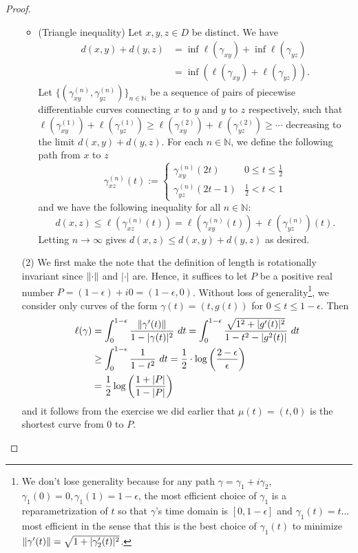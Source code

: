 \documentclass[10pt]{article}
\theoremstyle{plain}
\begin{document}
\begin{proof}
\begin{itemize}
\begin{itemize}
						\item (Triangle inequality) Let $x, y, z \in D$ be distinct. We have
							\begin{align*}
								d(x, y) + d(y, z) &= \inf \ell (\gamma_{xy}) + \inf{\ell(\gamma_{yz})} \\
								&= \inf( \ell(\gamma_{xy}) + \ell(\gamma_{yz})).
							\end{align*}
						Let $\{(\gamma_{xy}^{(n)}, \gamma_{yz}^{(n)})\}_{n \in \mathbb{N}}$ be a sequence of pairs of piecewise differentiable curves connecting $x$ to $y$ and $y$ to $z$ respectively, such that $\ell(\gamma_{xy}^{(1)}) + \ell(\gamma_{yz}^{(1)}) \geq \ell(\gamma_{xy}^{(2)}) + \ell(\gamma_{yz}^{(2)}) \geq \cdots$ decreasing to the limit $d(x, y) + d(y, z)$. For each $n \in \mathbb{N}$, we define the following path from $x$ to $z$ $$\gamma_{xz}^{(n)}(t) := \begin{cases}\gamma_{xy}^{(n)}(2t) & 0 \leq t \leq \frac{1}{2} \\ \gamma_{yz}^{(n)}(2t - 1) & \frac{1}{2} < t < 1\end{cases}$$ and we have the following inequality for all $n \in \mathbb{N}$: $$d(x, z) \leq \ell(\gamma_{xz}^{(n)}(t)) = \ell(\gamma_{xy}^{(n)}(t)) + \ell(\gamma_{yz}^{(n)})(t).$$ Letting $n \to \infty$ gives $d(x, z) \leq d(x, y) + d(y, z)$ as desired. 
					\end{itemize}
				
				\item[(2)] We first make the note that the definition of length is rotationally invariant since $\norm{\cdot}$ and $|\cdot|$ are. Hence, it suffices to let $P$ be a positive real number $P = (1 - \epsilon) + i0 = (1 - \epsilon, 0)$. Without loss of generality\footnote{We don't lose generality because for any path $\gamma = \gamma_1 + i \gamma_2$, $\gamma_1(0) = 0, \gamma_1(1) = 1 - \epsilon$, the most efficient choice of $\gamma_1$ is a reparametrization of $t$ so that $\gamma$'s time domain is $[0, 1 - \epsilon]$ and $\gamma_1(t) = t$... most efficient in the sense that this is the best choice of $\gamma_1(t)$ to minimize $\norm{\gamma'(t)} = \sqrt{1 + |\gamma_2'(t)|^2}$. }, we consider only curves of the form $\gamma(t) = (t, g(t))$ for $0 \leq t \leq 1 - \epsilon$. Then 
					\begin{align*}
						\ell(\gamma) &= \int_0^{1 - \epsilon} \frac{\norm{\gamma'(t)}}{1 - |\gamma(t)|^2} \ dt = \int_0^{1 - \epsilon} \frac{\sqrt{1^2 + |g'(t)|^2}}{1 - t^2 - |g^2(t)|} \ dt \\
						&\geq \int_0^{1 - \epsilon} \frac{1}{1 - t^2} \ dt = \frac{1}{2} \cdot \log \left(\frac{2 - \epsilon}{\epsilon}\right) \\
						&= \frac{1}{2} \log \left(\frac{1 + |P|}{1 - |P|}\right) 
					\end{align*}
				and it follows from the exercise we did earlier that $\mu(t) = (t, 0)$ is the shortest curve from $0$ to $P$. 
			\end{itemize}
		\end{proof}
	
\end{document}
